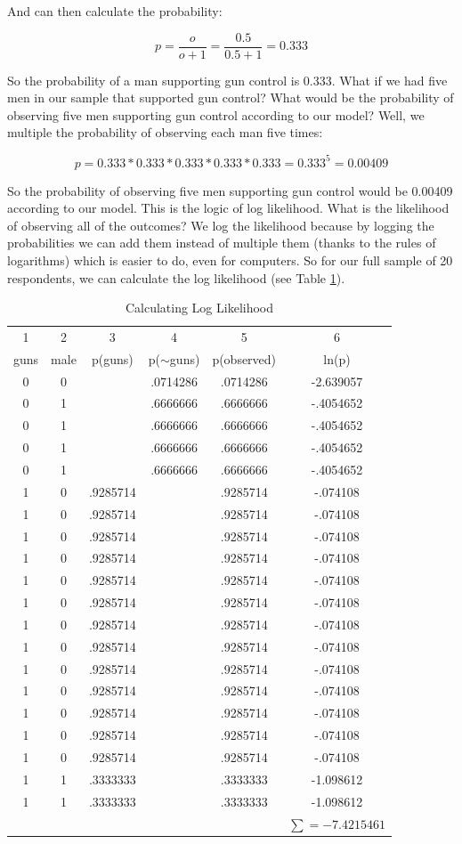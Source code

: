 \documentclass[12pt]{amsart}
\begin{document}
And can then calculate the probability:

\[ p = \frac{o}{o+1} = \frac{0.5}{0.5+1} = 0.333 \]

So the probability of a man supporting gun control is 0.333. What if we had five men in our sample that supported gun control? What would be the probability of observing five men supporting gun control according to our model? Well, we multiple the probability of observing each man five times:

\[ p = 0.333*0.333*0.333*0.333*0.333 = 0.333^5 = 0.00409 \]

So the probability of observing five men supporting gun control would be 0.00409 according to our model. This is the logic of log likelihood. What is the likelihood of observing all of the outcomes? We log the likelihood because by logging the probabilities we can add them instead of multiple them (thanks to the rules of logarithms) which is easier to do, even for computers. So for our full sample of 20 respondents, we can calculate the log likelihood (see Table \ref{tab:likelihood}).

\begin{table}[ht]
\caption{Calculating Log Likelihood}
\label{tab:likelihood}
\begin{tabular}{cccccc}
\hline
1&2&3&4&5&6\\
guns	&	male&	p(guns)&	p($\sim$guns)&	p(observed)&	ln(p)\\
\hline
0&	0&	&.0714286&	.0714286&	-2.639057\\
0&	1&	&.6666666&	.6666666&	-.4054652\\
0&	1&		&.6666666&	.6666666&	-.4054652\\
0&	1&		&.6666666&	.6666666	&-.4054652\\
0&	1&		&.6666666&	.6666666	&-.4054652\\
1&	0&	.9285714	&&	.9285714	&-.074108\\
1&	0&	.9285714	&&	.9285714	&-.074108\\
1&	0&	.9285714	&&	.9285714	&-.074108\\
1&	0&	.9285714	&&	.9285714	&-.074108\\
1&	0&	.9285714	&&	.9285714	&-.074108\\
1&	0&	.9285714	&&	.9285714	&-.074108\\
1&	0&	.9285714	&&	.9285714	&-.074108\\
1&	0&	.9285714	&&	.9285714	&-.074108\\
1&	0&	.9285714	&&	.9285714	&-.074108\\
1&	0&	.9285714	&&	.9285714	&-.074108\\
1&	0&	.9285714	&&	.9285714	&-.074108\\
1&	0&	.9285714	&&	.9285714	&-.074108\\
1&	0&	.9285714	&&	.9285714	&-.074108\\
1&	1&	.3333333	&&	.3333333	&-1.098612\\
1&	1&	.3333333	&&	.3333333	&-1.098612\\
\hline
	&	&	&	&	& $\sum = -7.4215461$\\
\hline
\end{tabular}
\end{table}
\end{document}
